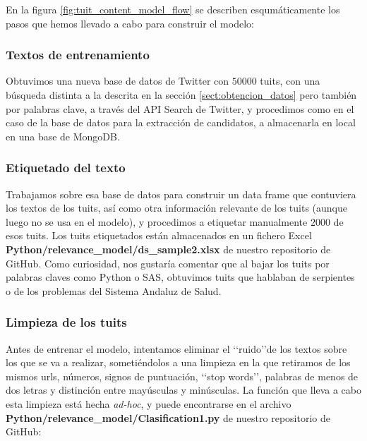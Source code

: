 
En la figura \ref{fig:tuit_content_model_flow} se describen esqumáticamente los pasos que hemos llevado a cabo para construir el modelo:

\subsubsection{Textos de entrenamiento}

Obtuvimos una nueva base de datos de Twitter con $50000$ tuits, con una búsqueda distinta
a la descrita en la sección \ref{sect:obtencion_datos} pero también por palabras clave,
a través del API Search de Twitter, y procedimos como en el caso
de la base de datos para la extracción de candidatos, a almacenarla en local en una base de MongoDB.


\subsubsection{Etiquetado del texto}
Trabajamos sobre esa base de datos para construir un data frame que contuviera los textos de los tuits,
así como otra información relevante de los tuits (aunque luego no se usa en el modelo), y procedimos
a etiquetar manualmente $2000$ de esos tuits. Los tuits etiquetados están almacenados en un fichero
Excel {\bf Python/relevance\_model/ds\_sample2.xlsx} de nuestro repositorio de GitHub.
Como curiosidad, nos gustaría comentar que al bajar los tuits por palabras claves como Python o SAS, 
obtuvimos tuits que hablaban de serpientes o de los problemas del Sistema Andaluz de Salud. 

\subsubsection{Limpieza de los tuits}
Antes de entrenar el modelo, intentamos eliminar el \lq\lq ruido\rq\rq de los textos 
sobre los que se va a realizar, sometiéndolos a una limpieza en la que retiramos
de los mismos urls, números, signos de puntuación, \lq\lq stop words\rq\rq, palabras de menos
de dos letras y distinción entre mayúsculas y minúsculas.
La función que lleva a cabo esta limpieza está hecha {\em ad-hoc}, y puede encontrarse en el
archivo {\bf Python/relevance\_model/Clasification1.py} de nuestro repositorio de GitHub:

